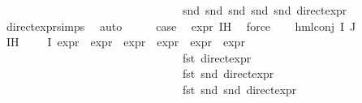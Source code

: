 \begin{isabellebody}
\ \ \ \ \ \ \ \ \ \ \ \ \ \ \ \ \ \ \ \ \ \ \ \ \ \ \ \ \ \ \ \ snd\ {\isacharparenleft}{\kern0pt}snd\ {\isacharparenleft}{\kern0pt}snd\ {\isacharparenleft}{\kern0pt}snd\ {\isacharparenleft}{\kern0pt}snd\ {\isacharparenleft}{\kern0pt}direct{\isacharunderscore}{\kern0pt}expr\ {\isasymphi}{\isacharparenright}{\kern0pt}{\isacharparenright}{\kern0pt}{\isacharparenright}{\kern0pt}{\isacharparenright}{\kern0pt}{\isacharparenright}{\kern0pt}{\isacharparenright}{\kern0pt}{\isachardoublequoteclose}\isanewline
\ \ \ \ \isamarkupfalse%
\ direct{\isacharunderscore}{\kern0pt}expr{\isachardot}{\kern0pt}simps{\isacharparenleft}{\kern0pt}{}{\isacharparenright}{\kern0pt}\ \isamarkupfalse%
\ auto\isanewline
\ \ \isamarkupfalse%
\ \isamarkupfalse%
\ {\isacharquery}{\kern0pt}case\ \isamarkupfalse%
\ expr\ IH\ \isamarkupfalse%
\ force\isanewline
{}\isamarkupfalse%
\isanewline
\ \ \isamarkupfalse%
\ {\isacharparenleft}{\kern0pt}hml{\isacharunderscore}{\kern0pt}conj\ I\ J\ {\isasymPhi}{\isacharparenright}{\kern0pt}\isanewline
\ \ \isamarkupfalse%
\ IH{\isacharcolon}{\kern0pt}\ {\isachardoublequoteopen}{\isasymforall}{\isasymphi}\ {\isasymin}\ {\isasymPhi}\ {\isacharbackquote}{\kern0pt}\ I{\isachardot}{\kern0pt}\ {\isacharparenleft}{\kern0pt}expr{\isacharunderscore}{\kern0pt}{}\ {\isasymphi}{\isacharcomma}{\kern0pt}\ expr{\isacharunderscore}{\kern0pt}{}\ {\isasymphi}{\isacharcomma}{\kern0pt}\ expr{\isacharunderscore}{\kern0pt}{}\ {\isasymphi}{\isacharcomma}{\kern0pt}\ expr{\isacharunderscore}{\kern0pt}{}\ {\isasymphi}{\isacharcomma}{\kern0pt}\ expr{\isacharunderscore}{\kern0pt}{}\ {\isasymphi}{\isacharcomma}{\kern0pt}\ expr{\isacharunderscore}{\kern0pt}{}\ {\isasymphi}{\isacharparenright}{\kern0pt}\ {\isacharequal}{\kern0pt}\isanewline
\ \ \ \ \ \ \ \ \ \ \ \ \ \ \ \ \ \ \ \ \ \ \ \ \ \ \ \ \ \ \ \ {\isacharparenleft}{\kern0pt}fst\ {\isacharparenleft}{\kern0pt}direct{\isacharunderscore}{\kern0pt}expr\ {\isasymphi}{\isacharparenright}{\kern0pt}{\isacharcomma}{\kern0pt}\ \isanewline
\ \ \ \ \ \ \ \ \ \ \ \ \ \ \ \ \ \ \ \ \ \ \ \ \ \ \ \ \ \ \ \ fst\ {\isacharparenleft}{\kern0pt}snd\ {\isacharparenleft}{\kern0pt}direct{\isacharunderscore}{\kern0pt}expr\ {\isasymphi}{\isacharparenright}{\kern0pt}{\isacharparenright}{\kern0pt}{\isacharcomma}{\kern0pt}\ \isanewline
\ \ \ \ \ \ \ \ \ \ \ \ \ \ \ \ \ \ \ \ \ \ \ \ \ \ \ \ \ \ \ \ fst\ {\isacharparenleft}{\kern0pt}snd\ {\isacharparenleft}{\kern0pt}snd\ {\isacharparenleft}{\kern0pt}direct{\isacharunderscore}{\kern0pt}expr\ {\isasymphi}{\isacharparenright}{\kern0pt}{\isacharparenright}{\kern0pt}{\isacharparenright}{\kern0pt}{\isacharcomma}{\kern0pt}\ \isanewline

\end{isabellebody}

